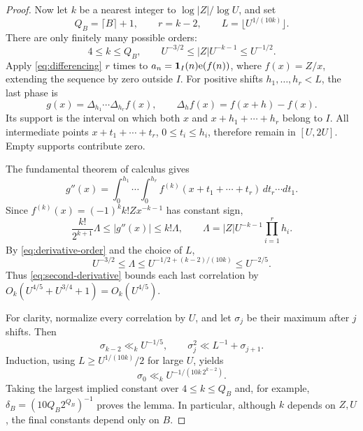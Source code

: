 \begin{proof}
Now let \(k\) be a nearest integer to \(\log|Z|/\log U\), and set
\[
 Q_B=\lceil B\rceil+1,\qquad
 r=k-2,\qquad L=\lfloor U^{1/(10k)}\rfloor.
\]
There are only finitely many possible orders:
\begin{equation}\label{eq:derivative-order}
 4\le k\le Q_B,\qquad
 U^{-3/2}\le |Z|U^{-k-1}\le U^{-1/2}.
\end{equation}
Apply \eqref{eq:differencing} \(r\) times to
\(a_n=\mathbf1_I(n)\mathrm e(f(n))\), where \(f(x)=Z/x\), extending the
sequence by zero outside \(I\).  For positive shifts
\(h_1,\ldots,h_r<L\), the last phase is
\[
 g(x)=\Delta_{h_1}\cdots\Delta_{h_r}f(x),
 \qquad \Delta_hf(x)=f(x+h)-f(x).
\]
Its support is the interval on which both \(x\) and
\(x+h_1+\cdots+h_r\) belong to \(I\).
All intermediate points \(x+t_1+\cdots+t_r\), \(0\le t_i\le h_i\),
therefore remain in \([U,2U]\).  Empty supports contribute zero.

The fundamental theorem of calculus gives
\[
 g''(x)=
 \int_0^{h_1}\!\cdots\!\int_0^{h_r}
 f^{(k)}(x+t_1+\cdots+t_r)\,dt_r\cdots dt_1.
\]
Since \(f^{(k)}(x)=(-1)^k k!Zx^{-k-1}\) has constant sign,
\[
 \frac{k!}{2^{k+1}}\Lambda
 \le |g''(x)|\le k!\Lambda,
 \qquad \Lambda=|Z|U^{-k-1}\prod_{i=1}^r h_i.
\]
By \eqref{eq:derivative-order} and the choice of \(L\),
\[
 U^{-3/2}\le\Lambda
 \le U^{-1/2+(k-2)/(10k)}\le U^{-2/5}.
\]
Thus \eqref{eq:second-derivative} bounds each last correlation by
\(O_k(U^{4/5}+U^{3/4}+1)=O_k(U^{4/5})\).

For clarity, normalize every correlation by \(U\), and let \(\sigma_j\)
be their maximum after \(j\) shifts.  Then
\[
 \sigma_{k-2}\ll_k U^{-1/5},
 \qquad \sigma_j^2\ll L^{-1}+\sigma_{j+1}.
\]
Induction, using \(L\ge U^{1/(10k)}/2\) for large \(U\), yields
\[
 \sigma_0\ll_k U^{-1/(10k\,2^{k-2})}.
\]
Taking the largest implied constant over \(4\le k\le Q_B\) and,
for example, \(\delta_B=(10Q_B2^{Q_B})^{-1}\) proves the lemma.
In particular, although \(k\) depends on \(Z,U\), the final constants
depend only on \(B\).
\end{proof}

